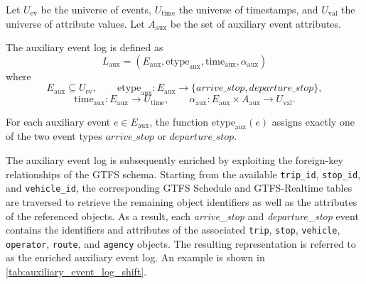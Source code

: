 \begin{definition}
Let $U_{\mathrm{ev}}$ be the universe of events, $U_{\mathrm{time}}$ the universe of timestamps, and $U_{\mathrm{val}}$ the universe of attribute values.
Let $A_{\mathrm{aux}}$ be the set of auxiliary event attributes.

The auxiliary event log is defined as
\[
L_{\mathrm{aux}}
=
(E_{\mathrm{aux}},
\mathrm{etype}_{\mathrm{aux}},
\mathrm{time}_{\mathrm{aux}},
\alpha_{\mathrm{aux}})
\]
where
\[
E_{\mathrm{aux}} \subseteq U_{\mathrm{ev}},
\qquad
\mathrm{etype}_{\mathrm{aux}}
:
E_{\mathrm{aux}}
\rightarrow
\{\textit{arrive\_stop},\textit{departure\_stop}\},
\]
\[
\mathrm{time}_{\mathrm{aux}}
:
E_{\mathrm{aux}}
\rightarrow
U_{\mathrm{time}},
\qquad
\alpha_{\mathrm{aux}}
:
E_{\mathrm{aux}}
\times
A_{\mathrm{aux}}
\rightarrow
U_{\mathrm{val}}.
\]

For each auxiliary event $e \in E_{\mathrm{aux}}$, the function
$\mathrm{etype}_{\mathrm{aux}}(e)$ assigns exactly one of the two event types
$\textit{arrive\_stop}$ or $\textit{departure\_stop}$.
\end{definition}

The auxiliary event log is subsequently enriched by exploiting the foreign-key relationships of the GTFS schema. Starting from the available \texttt{trip\_id}, \texttt{stop\_id}, and \texttt{vehicle\_id}, the corresponding GTFS Schedule and GTFS-Realtime tables are traversed to retrieve the remaining object identifiers as well as the attributes of the referenced objects. As a result, each \textit{arrive\_stop} and \textit{departure\_stop} event contains the identifiers and attributes of the associated \texttt{trip}, \texttt{stop}, \texttt{vehicle}, \texttt{operator}, \texttt{route}, and \texttt{agency} objects. The resulting representation is referred to as the enriched auxiliary event log. An example is shown in \autoref{tab:auxiliary_event_log_shift}.


